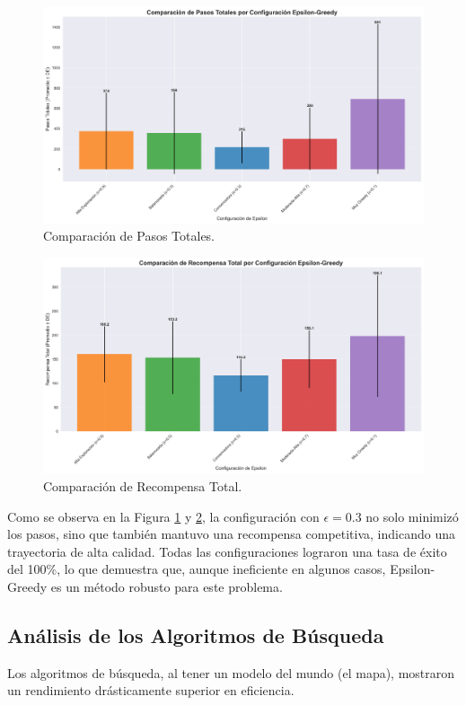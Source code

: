 \documentclass[12pt, oneside, openany]{book}
\begin{document}
\begin{figure}[H]
        \includegraphics[width=1\textwidth]{epsilon_pasos_comparacion.png}
        \caption{Comparación de Pasos Totales.}
        \label{fig:epsilon_pasos}
\end{figure}
\begin{figure}[H]
        \includegraphics[width=1\textwidth]{epsilon_recompensa_comparacion.png}
        \caption{Comparación de Recompensa Total.}
        \label{fig:epsilon_recompensa}
\end{figure}

Como se observa en la Figura \ref{fig:epsilon_pasos} y \ref{fig:epsilon_recompensa}, la configuración con $\epsilon=0.3$ no solo minimizó los pasos, sino que también mantuvo una recompensa competitiva, indicando una trayectoria de alta calidad. Todas las configuraciones lograron una tasa de éxito del 100\%, lo que demuestra que, aunque ineficiente en algunos casos, Epsilon-Greedy es un método robusto para este problema.

\subsection{Análisis de los Algoritmos de Búsqueda}
Los algoritmos de búsqueda, al tener un modelo del mundo (el mapa), mostraron un rendimiento drásticamente superior en eficiencia.
\end{document}
